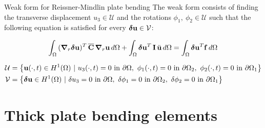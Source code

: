 \documentclass[aspectratio=169]{beamer}
\begin{document}
{
\color{white}
\begin{frame}{Weak form for Reissner-Mindlin plate bending}
  The weak form consists of finding the transverse displacement $u_{3}\in \mathcal U$ and the rotations $\phi_1,\ \phi_2\in \mathcal U$ such that the following equation is satisfied for every $\boldsymbol\delta\mathbf u\in \mathcal V$:
  \begin{block}{}
    \[
      \int_\Omega \, (\boldsymbol\nabla_r \boldsymbol\delta\mathbf{u})^T\, \overline{\mathbf C} \, \boldsymbol\nabla_r \mathbf u \, d\Omega + \int_\Omega \boldsymbol\delta\mathbf u^T\, \mathbf I\, \ddot{\mathbf u} \, d\Omega = \int_\Omega \boldsymbol\delta\mathbf u^T\mathbf f \, d\Omega
    \]
  \end{block}

  \vspace{-0.5cm}
  \begin{align*}
    \mathcal U & =\big\{\mathbf u(\cdot,t)\in H^1(\Omega)\ |\ u_3(\cdot,t)=0\text{ in } \partial\Omega,\   \phi_1(\cdot,t)=0\text{ in } \partial\Omega_2,\ \phi_2(\cdot,t)=0\text{ in } \partial\Omega_1 \big\} \\
    \mathcal V & =\big\{\bolddelta\mathbf u\in H^1(\Omega)\ |\ \delta u_3=0\text{ in } \partial\Omega,\  \delta\phi_1=0\text{ in } \partial\Omega_2,\ \delta\phi_2=0\text{ in } \partial\Omega_1\big\}
  \end{align*}
\end{frame}
}
\section{Thick plate bending elements}
\end{document}
